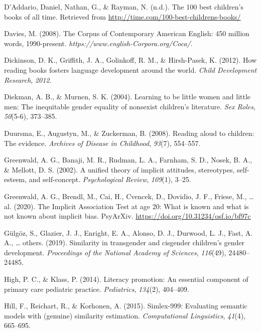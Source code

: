 \documentclass[
  english,
  ,man,floatsintext]{apa6}
\begin{document}
\leavevmode\hypertarget{ref-time_100_kidbooks}{}%
D'Addario, Daniel, Nathan, G., \& Rayman, N. (n.d.). The 100 best children's books of all time. Retrieved from \url{http://time.com/100-best-childrens-books/}

\leavevmode\hypertarget{ref-davies2008corpus}{}%
Davies, M. (2008). The Corpus of Contemporary American English: 450 million words, 1990-present. \emph{https://www.english-Corpora.org/Coca/}.

\leavevmode\hypertarget{ref-dickinson2012reading}{}%
Dickinson, D. K., Griffith, J. A., Golinkoff, R. M., \& Hirsh-Pasek, K. (2012). How reading books fosters language development around the world. \emph{Child Development Research}, \emph{2012}.

\leavevmode\hypertarget{ref-diekman2004learning}{}%
Diekman, A. B., \& Murnen, S. K. (2004). Learning to be little women and little men: The inequitable gender equality of nonsexist children's literature. \emph{Sex Roles}, \emph{50}(5-6), 373--385.

\leavevmode\hypertarget{ref-duursma2008reading}{}%
Duursma, E., Augustyn, M., \& Zuckerman, B. (2008). Reading aloud to children: The evidence. \emph{Archives of Disease in Childhood}, \emph{93}(7), 554--557.

\leavevmode\hypertarget{ref-greenwald2002unified}{}%
Greenwald, A. G., Banaji, M. R., Rudman, L. A., Farnham, S. D., Nosek, B. A., \& Mellott, D. S. (2002). A unified theory of implicit attitudes, stereotypes, self-esteem, and self-concept. \emph{Psychological Review}, \emph{109}(1), 3--25.

\leavevmode\hypertarget{ref-greenwald2020}{}%
Greenwald, A. G., Brendl, M., Cai, H., Cvencek, D., Dovidio, J. F., Friese, M., \ldots{} al. (2020). The Implicit Association Test at age 20: What is known and what is not known about implicit bias. PsyArXiv. \url{https://doi.org/10.31234/osf.io/bf97c}

\leavevmode\hypertarget{ref-gulgoz2019similarity}{}%
Gülgöz, S., Glazier, J. J., Enright, E. A., Alonso, D. J., Durwood, L. J., Fast, A. A., \ldots{} others. (2019). Similarity in transgender and cisgender children's gender development. \emph{Proceedings of the National Academy of Sciences}, \emph{116}(49), 24480--24485.

\leavevmode\hypertarget{ref-high2014literacy}{}%
High, P. C., \& Klass, P. (2014). Literacy promotion: An essential component of primary care pediatric practice. \emph{Pediatrics}, \emph{134}(2), 404--409.

\leavevmode\hypertarget{ref-hill2015simlex}{}%
Hill, F., Reichart, R., \& Korhonen, A. (2015). Simlex-999: Evaluating semantic models with (genuine) similarity estimation. \emph{Computational Linguistics}, \emph{41}(4), 665--695.
\end{document}
